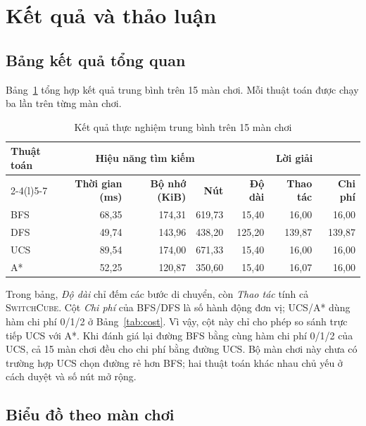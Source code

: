 \section{Kết quả và thảo luận}
\label{sec:results}

\subsection{Bảng kết quả tổng quan}

Bảng~\ref{tab:overall-results} tổng hợp kết quả trung bình trên 15 màn chơi.
Mỗi thuật toán được chạy ba lần trên từng màn chơi.

\begin{table}[H]
\centering
\caption{Kết quả thực nghiệm trung bình trên 15 màn chơi}
\label{tab:overall-results}
\small
\setlength{\tabcolsep}{4pt}
\begin{tabular}{@{}lrrrrrr@{}}
\toprule
\multirow{2}{*}{\textbf{Thuật toán}} &
\multicolumn{3}{c}{\textbf{Hiệu năng tìm kiếm}} &
\multicolumn{3}{c}{\textbf{Lời giải}} \\
\cmidrule(lr){2-4}\cmidrule(l){5-7}
& \textbf{Thời gian (ms)} & \textbf{Bộ nhớ (KiB)} & \textbf{Nút}
& \textbf{Độ dài} & \textbf{Thao tác} & \textbf{Chi phí} \\
\midrule
BFS & 68,35 & 174,31 & 619,73 & 15,40 & 16,00 & 16,00 \\
DFS & 49,74 & 143,96 & 438,20 & 125,20 & 139,87 & 139,87 \\
UCS & 89,54 & 174,00 & 671,33 & 15,40 & 16,00 & 16,00 \\
A*  & 52,25 & 120,87 & 350,60 & 15,40 & 16,07 & 16,00 \\
\bottomrule
\end{tabular}
\end{table}

Trong bảng, \emph{Độ dài} chỉ đếm các bước di chuyển, còn \emph{Thao tác}
tính cả \textsc{SwitchCube}. Cột \emph{Chi phí} của BFS/DFS là số hành động
đơn vị; UCS/A* dùng hàm chi phí 0/1/2 ở Bảng~\ref{tab:cost}. Vì vậy, cột này
chỉ cho phép so sánh trực tiếp UCS với A*. Khi đánh giá lại đường BFS bằng cùng
hàm chi phí 0/1/2 của UCS, cả 15 màn chơi đều cho chi phí bằng đường UCS. Bộ
màn chơi này chưa có trường hợp UCS chọn đường rẻ hơn BFS; hai thuật toán khác
nhau chủ yếu ở cách duyệt và số nút mở rộng.

\subsection{Biểu đồ theo màn chơi}

